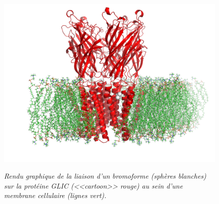 \begin{figure}
  \centering
  {\includegraphics[width=.75\linewidth]{./figures/ch4/ch4_glic+bromoform.pdf}}
    \caption{{\it Rendu graphique de la liaison d'un bromoforme (sphères blanches) sur la protéine GLIC (<<cartoon>> rouge) au sein d'une membrane cellulaire (lignes vert).}}
  \label{Fig:glic+bromoform}
  \hspace{0.3cm}
\end{figure}

